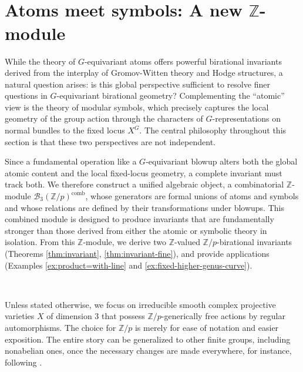 \documentclass[12pt,a4paper]{amsart}
\theoremstyle{definition}
\theoremstyle{remark}
\begin{document}
\ 


\

\section{Atoms meet symbols: A new $\mathbb Z$-module}
\label{sec:atomes-meet-symbols}

While the theory of \(G\)-equivariant atoms offers powerful birational invariants derived from the interplay of Gromov-Witten theory and Hodge structures, a natural question arises: is this global perspective sufficient to resolve finer questions in \(G\)-equivariant birational geometry? Complementing the ``atomic'' view is the theory of modular symbols, which precisely captures the local geometry of the group action through the characters of \(G\)-representations on normal bundles to the fixed locus \(X^G\). The central philosophy throughout this section is that these two perspectives are not independent. 

Since a fundamental operation like a \(G\)-equivariant blowup alters both the global atomic content and the local fixed-locus geometry, a complete invariant must track both. We therefore construct a unified algebraic object, a combinatorial \(\mathbb{Z}\)-module  \(\mathcal{B}_3(\mathbb Z/p)^{\mathrm{comb}}\), whose generators are formal unions of atoms and symbols and whose relations are defined by their transformations under blowups. This combined module is designed to produce invariants that are fundamentally stronger than those derived from either the atomic or symbolic theory in isolation. From this \(\mathbb{Z}\)-module, we derive two \(\mathbb{Z}\)-valued \(\mathbb Z/p\)-birational invariants (Theorems \ref{thm:invariant}, \ref{thm:invariant-fine}), and provide applications (Examples \ref{ex:product=with-line} and \ref{ex:fixed-higher-genus-curve}).

\ 

Unless stated otherwise, we focus on irreducible smooth complex projective varieties \(X\) of dimension \(3\) that possess \(\mathbb Z/p\)-generically free actions by regular automorphisms. The choice for $\mathbb Z/p$ is merely for ease of notation and easier exposition. The entire story can be generalized to other finite groups, including nonabelian ones, once the necessary changes are made everywhere, for instance, following \cites{Tschinkel2022, Kresch-Tschinke-Structure-and-Operations, Kresch2022}.
\end{document}
